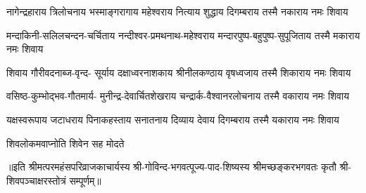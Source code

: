 

\fourlineindentedshloka
{नागेन्द्रहाराय त्रिलोचनाय}
{भस्माङ्गरागाय महेश्वराय}
{नित्याय शुद्धाय दिगम्बराय}
{तस्मै नकाराय नमः शिवाय}%

\fourlineindentedshloka
{मन्दाकिनी-सलिलचन्दन-चर्चिताय}
{नन्दीश्वर-प्रमथनाथ-महेश्वराय}
{मन्दारपुष्प-बहुपुष्प-सुपूजिताय}
{तस्मै मकाराय नमः शिवाय}%

\fourlineindentedshloka
{शिवाय गौरीवदनाब्ज-वृन्द-}
{सूर्याय दक्षाध्वरनाशकाय}
{श्रीनीलकण्ठाय वृषध्वजाय}
{तस्मै शिकाराय नमः शिवाय}%

\fourlineindentedshloka
{वसिष्ठ-कुम्भोद्भव-गौतमार्य-}
{मुनीन्द्र-देवार्चितशेखराय}
{चन्द्रार्क-वैश्वानरलोचनाय}
{तस्मै वकाराय नमः शिवाय}%

\fourlineindentedshloka
{यक्षस्वरूपाय जटाधराय}
{पिनाकहस्ताय सनातनाय}
{दिव्याय देवाय दिगम्बराय}
{तस्मै यकाराय नमः शिवाय}%

{शिवलोकमवाप्नोति शिवेन सह मोदते}

॥इति श्रीमत्परमहंसपरिव्राजकाचार्यस्य श्री-गोविन्द-भगवत्पूज्य-पाद-शिष्यस्य 
श्रीमच्छङ्करभगवतः कृतौ श्री-शिवपञ्चाक्षरस्तोत्रं सम्पूर्णम्॥